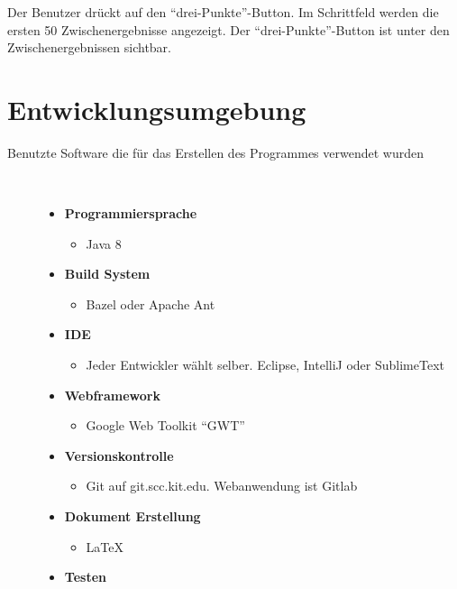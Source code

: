 \documentclass[parskip=full,11pt,twoside]{scrartcl}
\begin{document}
{Der Benutzer drückt auf den \enquote {drei-Punkte}-Button.}
{Im Schrittfeld werden die ersten 50 Zwischenergebnisse angezeigt. Der \enquote {drei-Punkte}-Button ist unter den Zwischenergebnissen sichtbar.}

\newpage
\section{Entwicklungsumgebung}
  \begin{description}
	\item[Benutzte Software die für das Erstellen des Programmes verwendet wurden]~\par
	\begin{itemize}
		\item \textbf{Programmiersprache}
		\begin{itemize}
			\item Java 8
		\end{itemize}
		\item \textbf{Build System}
		\begin{itemize}
			\item Bazel oder Apache Ant
		\end{itemize}
		\item \textbf{IDE}
		\begin{itemize}
			\item Jeder Entwickler wählt selber. Eclipse, IntelliJ oder SublimeText
		\end{itemize}
		\item \textbf{Webframework}
		\begin{itemize}
			\item Google Web Toolkit \enquote{GWT}
		\end{itemize}
		\item \textbf{Versionskontrolle}
		\begin{itemize}
			\item Git auf git.scc.kit.edu. Webanwendung ist Gitlab
		\end{itemize}
		\item \textbf{Dokument Erstellung}
		\begin{itemize}
			\item LaTeX
		\end{itemize}
		\item \textbf{Testen}
		\begin{itemize}

\end{itemize}
\end{itemize}
\end{description}
\end{document}
